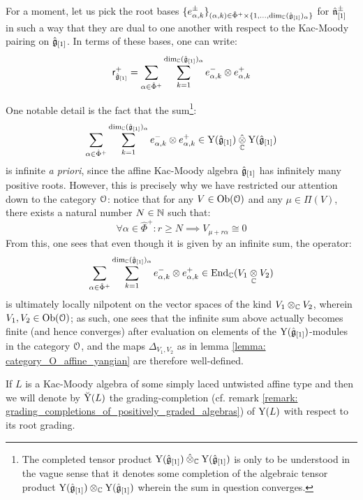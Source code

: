        \begin{remark}
            For a moment, let us pick the root bases $\{ e_{\alpha, k}^{\pm} \}_{(\alpha, k) \in \hat{\Phi}^+ \x \{1, ..., \dim_{\bbC} (\hat{\g}_{[1]})_{\alpha} \}}$ for $\hat{\mathfrak{n}}_{[1]}^{\pm}$ in such a way that they are dual to one another with respect to the Kac-Moody pairing on $\hat{\mathfrak{g}}_{[1]}$. In terms of these bases, one can write:
                $$\sfr_{\hat{\g}_{[1]}}^+ = \sum_{\alpha \in \hat{\Phi}^+} \sum_{k = 1}^{ \dim_{\bbC} (\hat{\g}_{[1]})_{\alpha} } e_{\alpha, k}^- \tensor e_{\alpha, k}^+$$
        
            One notable detail is the fact that the sum\footnote{The completed tensor product $\rmY(\hat{\g}_{[1]}) \hattensor_{\bbC} \rmY(\hat{\g}_{[1]})$ is only to be understood in the vague sense that it denotes some completion of the algebraic tensor product $\rmY(\hat{\g}_{[1]}) \tensor_{\bbC} \rmY(\hat{\g}_{[1]})$ wherein the sum in question converges.}:
                $$\sum_{\alpha \in \hat{\Phi}^+} \sum_{k = 1}^{ \dim_{\bbC} (\hat{\g}_{[1]})_{\alpha} } e_{\alpha, k}^- \tensor e_{\alpha, k}^+ \in \rmY(\hat{\g}_{[1]}) \hattensor_{\bbC} \rmY(\hat{\g}_{[1]})$$
            is infinite \textit{a priori}, since the affine Kac-Moody algebra $\hat{\mathfrak{g}}_{[1]}$ has infinitely many positive roots. However, this is precisely why we have restricted our attention down to the category $\mathcal{O}$: notice that for any $V \in \mathrm{Ob}(\mathcal{O})$ and any $\mu \in \Pi(V)$, there exists a natural number $N \in \mathbb{N}$ such that:
                $$\forall \alpha \in \hat{\Phi}^+: r \geq N \implies V_{\mu + r \alpha} \cong 0$$
            From this, one sees that even though it is given by an infinite sum, the operator:
                $$\sum_{\alpha \in \hat{\Phi}^+} \sum_{k = 1}^{ \dim_{\bbC} (\hat{\g}_{[1]})_{\alpha} } e_{\alpha, k}^- \tensor e_{\alpha, k}^+ \in \End_{\bbC}(V_1 \tensor_{\bbC} V_2)$$
            is ultimately locally nilpotent on the vector spaces of the kind $V_1 \tensor_{\bbC} V_2$, wherein $V_1, V_2 \in \mathrm{Ob}(\mathcal{O})$; as such, one sees that the infinite sum above actually becomes finite (and hence converges) after evaluation on elements of the $\mathrm{Y}(\hat{\mathfrak{g}}_{[1]})$-modules in the category $\mathcal{O}$, and the maps $\Delta_{V_1, V_2}$ as in lemma \ref{lemma: category_O_affine_yangian} are therefore well-defined. 
        \end{remark}
        \begin{convention}
            If $L$ is a Kac-Moody algebra of some simply laced untwisted affine type and then we will denote by $\breve{\mathrm{Y}}(L)$ the grading-completion (cf. remark \ref{remark: grading_completions_of_positively_graded_algebras}) of $\mathrm{Y}(L)$ with respect to its root grading.
        \end{convention}

